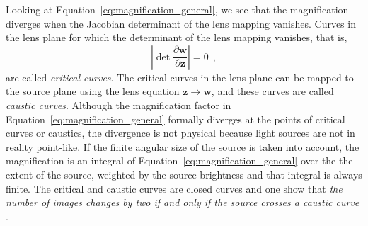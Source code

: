 \documentclass[12pt,dvipsnames]{report}
\newcommand{\hquad}{~~}
\begin{document}
Looking at Equation~\ref{eq:magnification_general}, we see that the
magnification diverges when the Jacobian determinant of the lens mapping
vanishes. Curves in the lens plane for which the determinant of the lens
mapping vanishes, that is,
\begin{equation}
    \left\lvert\det
    \frac{\partial \mathbf w}{\partial \mathbf z} \right\rvert=0
    \hquad,
\end{equation}
are called \emph{critical curves}.
The critical curves in the lens plane can be mapped to the source plane using
the lens equation $\mathbf{z}\rightarrow \mathbf{w}$, and these curves 
are called \emph{caustic curves}.
Although the magnification factor in Equation~\ref{eq:magnification_general} formally
diverges at the points of critical curves or caustics,
the divergence is not physical because light sources are not in reality point-like.
If the finite angular size of the source is taken into
account, the magnification is an integral of Equation~\ref{eq:magnification_general} over the
the extent of the source, weighted by the source brightness and that integral is always finite.
The critical and caustic curves are closed curves and one show that \emph{the
    number of images changes by two if and only if the source crosses a caustic curve}
\citep[][Chapter 6]{1992grle.book.....S}.
\end{document}
